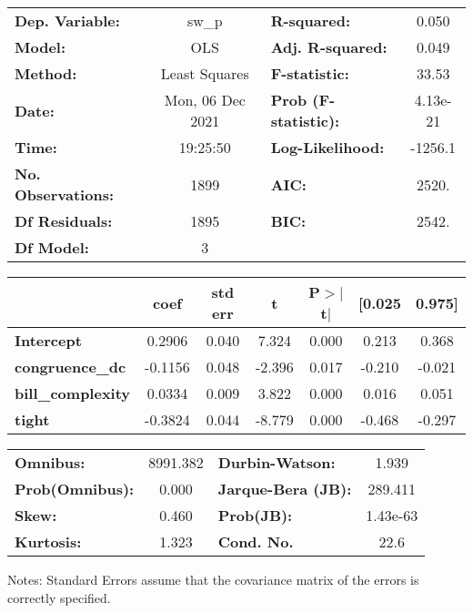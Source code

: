 \begin{center}
\begin{tabular}{lclc}
\toprule
\textbf{Dep. Variable:}    &      sw\_p       & \textbf{  R-squared:         } &     0.050   \\
\textbf{Model:}            &       OLS        & \textbf{  Adj. R-squared:    } &     0.049   \\
\textbf{Method:}           &  Least Squares   & \textbf{  F-statistic:       } &     33.53   \\
\textbf{Date:}             & Mon, 06 Dec 2021 & \textbf{  Prob (F-statistic):} &  4.13e-21   \\
\textbf{Time:}             &     19:25:50     & \textbf{  Log-Likelihood:    } &   -1256.1   \\
\textbf{No. Observations:} &        1899      & \textbf{  AIC:               } &     2520.   \\
\textbf{Df Residuals:}     &        1895      & \textbf{  BIC:               } &     2542.   \\
\textbf{Df Model:}         &           3      & \textbf{                     } &             \\
\bottomrule
\end{tabular}
\begin{tabular}{lcccccc}
                          & \textbf{coef} & \textbf{std err} & \textbf{t} & \textbf{P$> |$t$|$} & \textbf{[0.025} & \textbf{0.975]}  \\
\midrule
\textbf{Intercept}        &       0.2906  &        0.040     &     7.324  &         0.000        &        0.213    &        0.368     \\
\textbf{congruence\_dc}   &      -0.1156  &        0.048     &    -2.396  &         0.017        &       -0.210    &       -0.021     \\
\textbf{bill\_complexity} &       0.0334  &        0.009     &     3.822  &         0.000        &        0.016    &        0.051     \\
\textbf{tight}            &      -0.3824  &        0.044     &    -8.779  &         0.000        &       -0.468    &       -0.297     \\
\bottomrule
\end{tabular}
\begin{tabular}{lclc}
\textbf{Omnibus:}       & 8991.382 & \textbf{  Durbin-Watson:     } &    1.939  \\
\textbf{Prob(Omnibus):} &   0.000  & \textbf{  Jarque-Bera (JB):  } &  289.411  \\
\textbf{Skew:}          &   0.460  & \textbf{  Prob(JB):          } & 1.43e-63  \\
\textbf{Kurtosis:}      &   1.323  & \textbf{  Cond. No.          } &     22.6  \\
\bottomrule
\end{tabular}
\end{center}

Notes: \newline
 [1] Standard Errors assume that the covariance matrix of the errors is correctly specified.